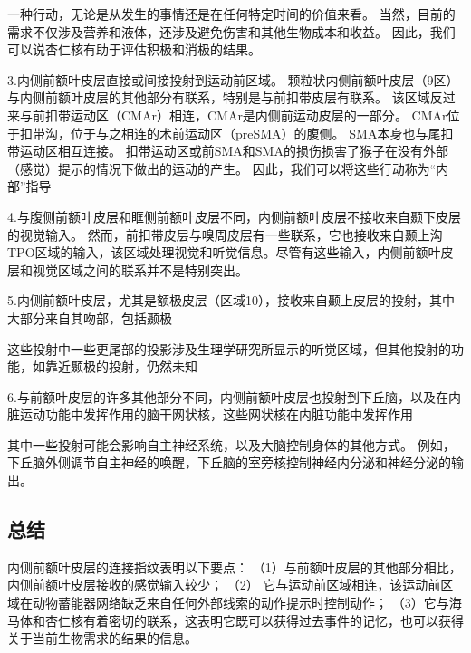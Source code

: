 一种行动，无论是从发生的事情还是在任何特定时间的价值来看。
当然，目前的需求不仅涉及营养和液体，还涉及避免伤害和其他生物成本和收益。
因此，我们可以说杏仁核有助于评估积极和消极的结果。\par


3.内侧前额叶皮层直接或间接投射到运动前区域。
颗粒状内侧前额叶皮层（9区）与内侧前额叶皮层的其他部分有联系，特别是与前扣带皮层有联系\cite{vogt1987cingulate}。
该区域反过来与前扣带运动区（CMAr）相连，CMAr是内侧前运动皮层的一部分\cite{morecraft1998convergence}。
CMAr位于扣带沟\cite{dum2002motor}，位于与之相连的术前运动区（preSMA）的腹侧\cite{luppino1993corticocortical}。
SMA本身也与尾扣带运动区相互连接\cite{luppino1993corticocortical}。
扣带运动区或前SMA和SMA的损伤损害了猴子在没有外部（感觉）提示的情况下做出的运动的产生\cite{thaler1995functions}。
因此，我们可以将这些行动称为“内部”指导\par


4.与腹侧前额叶皮层和眶侧前额叶皮层不同，内侧前额叶皮层不接收来自颞下皮层的视觉输入\cite{carmichael1995sensory,kondo2005differential}。
然而，前扣带皮层与嗅周皮层有一些联系，它也接收来自颞上沟TPO区域的输入\cite{kondo2005differential}，该区域处理视觉和听觉信息。尽管有这些输入，内侧前额叶皮层和视觉区域之间的联系并不是特别突出。\par


5.内侧前额叶皮层，尤其是额极皮层（区域10），接收来自颞上皮层的投射，其中大部分来自其吻部，包括颞极\cite{barbas1999medial,kondo2003differential}\par
这些投射中一些更尾部的投影涉及生理学研究所显示的听觉区域\cite{hackett1998subdivisions}，但其他投射的功能，如靠近颞极的投射，仍然未知\par


6.与前额叶皮层的许多其他部分不同，内侧前额叶皮层也投射到下丘脑\cite{rempel1998topographic}，以及在内脏运动功能中发挥作用的脑干网状核，这些网状核在内脏功能中发挥作用\cite{ongur1998prefrontal}\par


其中一些投射可能会影响自主神经系统，以及大脑控制身体的其他方式。
例如，下丘脑外侧调节自主神经的唤醒，下丘脑的室旁核控制神经内分泌和神经分泌的输出。\par



\subsection{总结}

内侧前额叶皮层的连接指纹表明以下要点：
（1）与前额叶皮层的其他部分相比，内侧前额叶皮层接收的感觉输入较少；
（2） 它与运动前区域相连，该运动前区域在动物蓄能器网络缺乏来自任何外部线索的动作提示时控制动作；
（3）它与海马体和杏仁核有着密切的联系，这表明它既可以获得过去事件的记忆，也可以获得关于当前生物需求的结果的信息。\par


